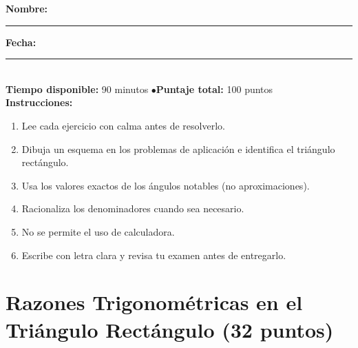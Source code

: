 \documentclass[12pt, letterpaper]{article}
\begin{document}


\vspace{4pt}
\begin{cuadroinfo}
  \small
  \textbf{Nombre:} \rule{0.55\linewidth}{0.4pt} \quad \textbf{Fecha:} \rule{0.15\linewidth}{0.4pt} \\[6pt]
  \textbf{Tiempo disponible:} 90 minutos \quad$\bullet$\quad \textbf{Puntaje total:} 100 puntos \\[4pt]
  \textbf{Instrucciones:}
  \begin{enumerate}[leftmargin=*]
    \item Lee cada ejercicio con calma antes de resolverlo.
    \item Dibuja un esquema en los problemas de aplicación e identifica el triángulo rectángulo.
    \item Usa los valores exactos de los ángulos notables (no aproximaciones).
    \item Racionaliza los denominadores cuando sea necesario.
    \item No se permite el uso de calculadora.
    \item Escribe con letra clara y revisa tu examen antes de entregarlo.
  \end{enumerate}
\end{cuadroinfo}

\vspace{8pt}

\section{Razones Trigonométricas en el Triángulo Rectángulo (32 puntos)}
\end{document}
